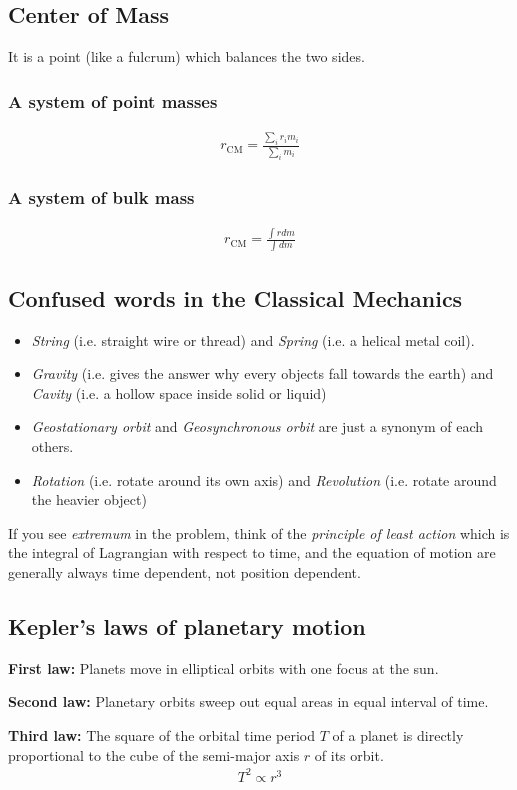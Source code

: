 \subsection{Center of Mass}
It is a point (like a fulcrum) which balances the two sides.

\subsubsection*{A system of point masses}
\begin{align*}
r_{\text{CM}} = \frac{\sum_{i} r_{i} m_{i}}{\sum_{i} m_{i}}
\end{align*}

\subsubsection*{A system of bulk mass}
\begin{align*}
r_{\text{CM}} = \frac{\int r dm}{\int dm}
\end{align*}
 
\subsection*{Confused words in the Classical Mechanics}

\begin{itemize}
\item \emph{String} (i.e. straight wire or thread) and \emph{Spring} (i.e. a helical metal coil).
\item \emph{Gravity} (i.e. gives the answer why every objects fall towards the earth) and \emph{Cavity} (i.e. a hollow space inside solid or liquid)
\item \emph{Geostationary orbit} and \emph{Geosynchronous orbit} are just a synonym of each others. 
\item \emph{Rotation} (i.e. rotate around its own axis) and \emph{Revolution} (i.e. rotate around the heavier object)
\end{itemize}

If you see \emph{extremum} in the problem, think of the \emph{principle of least action} which is the integral of Lagrangian with respect to time, and the equation of motion are generally always time dependent, not position dependent.

\subsection{Kepler's laws of planetary motion}

\noindent\textbf{First law:} Planets move in elliptical orbits with one focus at the sun.

\noindent\textbf{Second law:} Planetary orbits sweep out equal areas in equal interval of time.

\noindent\textbf{Third law:} The square of the orbital time period $T$ of a planet is directly proportional to the cube of the semi-major axis $r$ of its orbit.
\begin{align*}
T^{2} \propto r^{3}
\end{align*}

